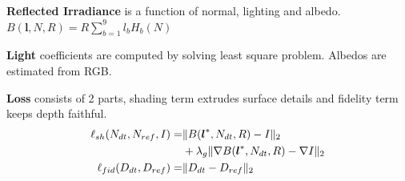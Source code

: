 \documentclass[landscape,a0paper,fontscale=0.292]{baposter}
\newcommand{\vect}[1]{\boldsymbol{#1}}  %
\begin{document}
\begin{poster}
{   \textbf{Reflected Irradiance} is a function of normal, lighting and albedo. $B(\vect{l}, N, R) = R \sum_{b=1}^9 l_b H_b(N)$
   
   \textbf{Light} coefficients are computed by solving least square problem. Albedos are estimated from RGB.

   \textbf{Loss} consists of 2 parts, shading term extrudes surface details and fidelity term keeps depth faithful.
   \vspace{-2em}
   \begin{align}
   \ell_{sh} (N_{dt}, N_{ref}, I) = &\lVert B(\vect{l}^*, N_{dt}, R) -  I \lVert_2  \notag \\
    &+ \lambda_{g} \lVert \nabla B(\vect{l}^*, N_{dt}, R) - \nabla I \lVert_2 \notag \\
   \ell_{fid}(D_{dt}, D_{ref}) = &\lVert D_{dt} - D_{ref} \lVert_2 \notag
   \end{align}
  }


%     
%     
%
%


\end{poster}
\end{document}
